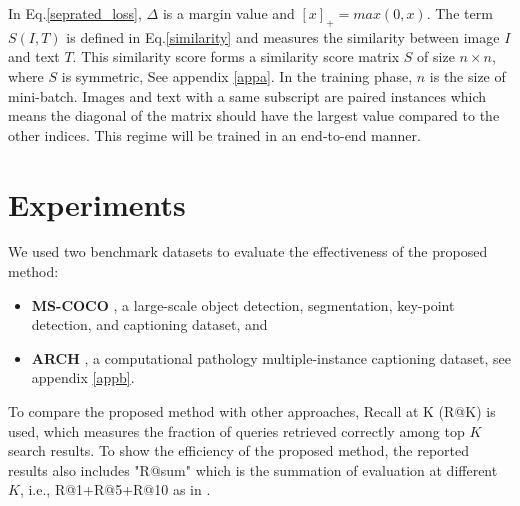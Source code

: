 \documentclass{midl}
\begin{document}
In Eq.\ref{seprated_loss}, $\Delta$ is a margin value and $[x]_+ = max(0,x)$. The term $S(I,T)$ is defined in Eq.\ref{similarity} and measures the similarity between image $I$ and text $T$. This similarity score forms a similarity score matrix $S$ of size $n\times n$, where $S$ is symmetric, See appendix \ref{appa}. In the training phase, $n$ is the size of mini-batch. Images and text with a same subscript are paired instances which means the diagonal of the matrix should have the largest value compared to the other indices. This regime will be trained in an end-to-end manner.


\section{Experiments}
We used two benchmark datasets to evaluate the effectiveness of the proposed method:
\begin{itemize}
    \item \textbf{MS-COCO} \cite{lin2014microsoft}, a large-scale object detection, segmentation, key-point detection, and captioning dataset, and 
    \item \textbf{ARCH} \cite{gamper2021multiple},  a computational pathology multiple-instance captioning dataset, see appendix \ref{appb}.
    \end{itemize}
    To compare the proposed method with other approaches, Recall at K (R@K) is used, which measures the fraction of queries retrieved correctly among top $K$ search results\cite{chen2020imram,lee2018stacked}. To show the efficiency of the proposed method, the reported results also includes "R@sum" which is the summation of evaluation at different $K$, i.e., R@1+R@5+R@10 as in \cite{huang2017instance}.
\end{document}
